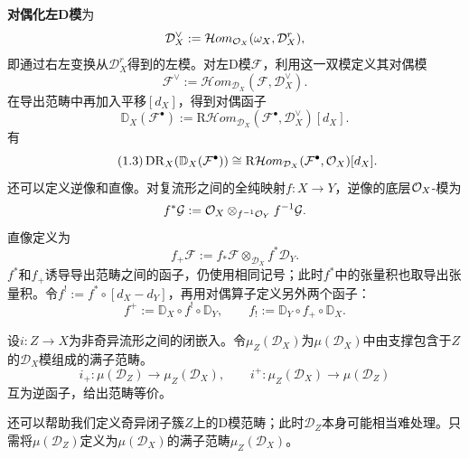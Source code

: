 \textbf{对偶化左D模}为
\[\mathcal D_X^\vee:=\mathcal Hom_{\mathcal O_X}(\omega_X,\mathcal D_X^r),\]
即通过右左变换从$\mathcal D_X^r$得到的左模。对左D模$\mathcal F$，利用这一双模定义其对偶模
\[\mathcal F^\vee:=\mathcal Hom_{\mathcal D_X}(\mathcal F,\mathcal D_X^\vee).\]
在导出范畴中再加入平移$[d_X]$，得到对偶函子
\[\mathbb D_X(\mathcal F^\bullet):=\mathrm R\mathcal Hom_{\mathcal D_X}(\mathcal F^\bullet,\mathcal D_X^\vee)[d_X].\]
有
\begin{equation}\tag{1.3}\label{L14eq13}
\operatorname{DR}_X(\mathbb D_X(\mathcal F^\bullet))\cong\mathrm R\mathcal Hom_{\mathcal D_X}(\mathcal F^\bullet,\mathcal O_X)[d_X].
\end{equation}
还可以定义逆像和直像。对复流形之间的全纯映射$f:X\to Y$，逆像的底层$\mathcal O_X$-模为
\[f^*\mathcal G:=\mathcal O_X\otimes_{f^{-1}\mathcal O_Y}f^{-1}\mathcal G.\]
直像定义为
\[f_+\mathcal F:=f_*\mathcal F\otimes_{\mathcal D_X}f^*\mathcal D_Y.\]
$f^*$和$f_+$诱导导出范畴之间的函子，仍使用相同记号；此时$f^*$中的张量积也取导出张量积。令$f^!:=f^*\circ[d_X-d_Y]$，再用对偶算子定义另外两个函子：
\[f^+:=\mathbb D_X\circ f^!\circ\mathbb D_Y,\qquad f_!:=\mathbb D_Y\circ f_+\circ\mathbb D_X.\]
\begin{theorem}[Kashiwara]\label{L14S1O7}
设$i:Z\to X$为非奇异流形之间的闭嵌入。令$\mu_Z(\mathcal D_X)$为$\mu(\mathcal D_X)$中由支撑包含于$Z$的$\mathcal D_X$模组成的满子范畴。
\[i_+:\mu(\mathcal D_Z)\to\mu_Z(\mathcal D_X),\qquad i^+:\mu_Z(\mathcal D_X)\to\mu(\mathcal D_Z)\]
互为逆函子，给出范畴等价。
\end{theorem}
\begin{note}[L14S1O8]
还可以帮助我们定义奇异闭子簇$Z$上的D模范畴；此时$\mathcal D_Z$本身可能相当难处理。只需将$\mu(\mathcal D_Z)$定义为$\mu(\mathcal D_X)$的满子范畴$\mu_Z(\mathcal D_X)$。
\end{note}
